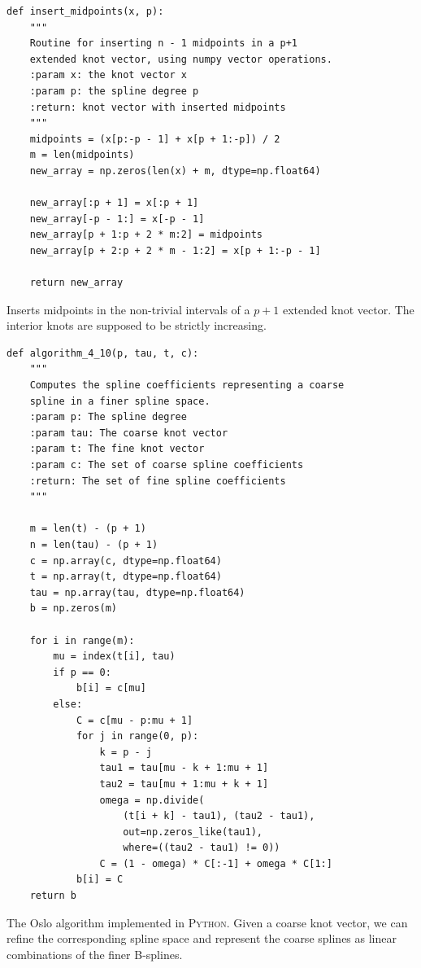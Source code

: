 \documentclass{article}
\begin{document}
    \begin{listing}[htbp]
    \begin{verbatim}
def insert_midpoints(x, p):
    """
    Routine for inserting n - 1 midpoints in a p+1 
    extended knot vector, using numpy vector operations.
    :param x: the knot vector x
    :param p: the spline degree p
    :return: knot vector with inserted midpoints
    """
    midpoints = (x[p:-p - 1] + x[p + 1:-p]) / 2
    m = len(midpoints)
    new_array = np.zeros(len(x) + m, dtype=np.float64)

    new_array[:p + 1] = x[:p + 1]
    new_array[-p - 1:] = x[-p - 1]
    new_array[p + 1:p + 2 * m:2] = midpoints
    new_array[p + 2:p + 2 * m - 1:2] = x[p + 1:-p - 1]

    return new_array
    \end{verbatim}
    \caption{Inserts midpoints in the non-trivial intervals of a $p+1$ extended
    knot vector. The interior knots are supposed to be strictly increasing.}
    \label{lst:midpoints}
\end{listing}

\begin{listing}[htbp]
    \begin{verbatim}
def algorithm_4_10(p, tau, t, c):
    """
    Computes the spline coefficients representing a coarse 
    spline in a finer spline space.
    :param p: The spline degree
    :param tau: The coarse knot vector
    :param t: The fine knot vector
    :param c: The set of coarse spline coefficients
    :return: The set of fine spline coefficients
    """

    m = len(t) - (p + 1)
    n = len(tau) - (p + 1)
    c = np.array(c, dtype=np.float64)
    t = np.array(t, dtype=np.float64)
    tau = np.array(tau, dtype=np.float64)
    b = np.zeros(m)

    for i in range(m):
        mu = index(t[i], tau)
        if p == 0:
            b[i] = c[mu]
        else:
            C = c[mu - p:mu + 1]
            for j in range(0, p):
                k = p - j
                tau1 = tau[mu - k + 1:mu + 1]
                tau2 = tau[mu + 1:mu + k + 1]
                omega = np.divide(
                    (t[i + k] - tau1), (tau2 - tau1),
                    out=np.zeros_like(tau1),
                    where=((tau2 - tau1) != 0))
                C = (1 - omega) * C[:-1] + omega * C[1:]
            b[i] = C
    return b
    \end{verbatim}
    \caption{The Oslo algorithm implemented in \textsc{Python}. Given a coarse
    knot vector, we can refine the corresponding spline space and represent the
coarse splines as linear combinations of the finer B-splines.}
    \label{lst:oslo} 
\end{listing}
    
\end{document}

